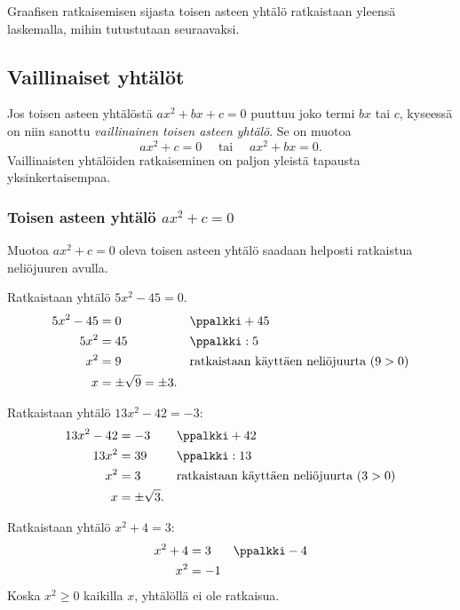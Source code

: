Graafisen ratkaisemisen sijasta toisen asteen yhtälö ratkaistaan
yleensä laskemalla, mihin tutustutaan seuraavaksi.

\subsection*{Vaillinaiset yhtälöt}
Jos toisen asteen yhtälöstä $ax^2+bx+c=0$ puuttuu joko termi $bx$ tai $c$, 
kyseessä on niin sanottu \emph{vaillinainen toisen asteen yhtälö}. Se on muotoa
\[ax^2+c=0 \quad \text{ tai } \quad ax^2+bx=0.\]
Vaillinaisten yhtälöiden ratkaiseminen on paljon yleistä tapausta yksinkertaisempaa.

\subsubsection*{Toisen asteen yhtälö $ax^2+c=0$}
Muotoa $ax^2+c = 0$ oleva toisen asteen yhtälö saadaan helposti ratkaistua neliöjuuren avulla.

\begin{esimerkki}
Ratkaistaan yhtälö $5x^2-45=0$.
\begin{align*}
5x^2-45 &= 0 &&\ppalkki + 45 \\
5x^2 &= 45 &&\ppalkki : 5 \\
x^2 &= 9 &&\text{ratkaistaan käyttäen neliöjuurta ($9 > 0$)} \\
x &= \pm \sqrt{9} = \pm 3.
\end{align*}
\end{esimerkki}

\begin{esimerkki}
Ratkaistaan yhtälö $13x^2-42=-3$:
\begin{align*}
13x^2-42 &= -3 &&\ppalkki + 42 \\
13x^2 &= 39 &&\ppalkki : 13 \\
x^2 &= 3 &&\text{ratkaistaan käyttäen neliöjuurta ($3 > 0$)} \\
x &= \pm \sqrt{3}.
\end{align*}
\end{esimerkki}

\begin{esimerkki}
Ratkaistaan yhtälö $x^2+4=3$:
\begin{align*}
x^2+4 &= 3 &&\ppalkki - 4 \\
x^2 &= -1
\end{align*}
Koska $x^2 \geq 0$ kaikilla $x$, yhtälöllä ei ole ratkaisua.
\end{esimerkki}

